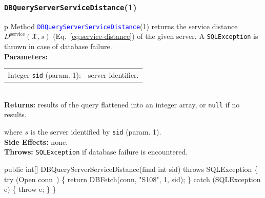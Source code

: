 \documentclass{article}
\def\nwendcode{\endtrivlist \endgroup}      %
\let\nwdocspar=\par
\theoremstyle{definition}                   %
\begin{document}
\subsubsection{{\tt{}\protect{}DBQueryServerServiceDistance}(1)}
\begin{tabular}{p{\textwidth}}
\toprule
{}
Method \textcolor{blue}{{\tt{}\protect{}DBQueryServerServiceDistance}}(1) returns the
service distance $D^\textrm{service}(\mathcal{X},s)$
(Eq.~\ref{eq:service-distance}) of the given server.
A {\tt{}SQLException} is thrown in case of database failure.\\
\midrule
\textbf{Parameters:}\\
\begin{tabular}{lp{116mm}}
Integer {\tt{}sid} (param. 1):&server identifier.
\end{tabular}\\
\textbf{Returns:} results of the query flattened into an integer array,
or {\tt{}null} if no results.


where $s$ is the server identified by {\tt{}sid} (param. 1).\\
\textbf{Side Effects:} none.\\
\textbf{Throws:} {\tt{}SQLException} if database failure is encountered.\\
\bottomrule
\end{tabular}
\nwenddocs{}\plusendmoddef
public int[] DBQueryServerServiceDistance(final int sid) throws SQLException \{
  try (\LA{}Open \code{}conn\edoc{}~{\nwtagstyle{}}\RA{}) \{
    return DBFetch(conn, "S108", 1, sid);
  \} catch (SQLException e) \{
    throw e;
  \}
\}
\eatline
{}\nwendcode{}\nwdocspar
\end{document}
